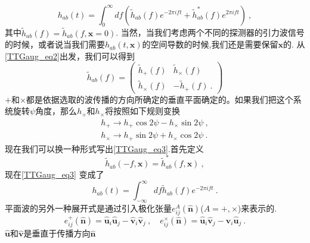 \begin{equation}\label{TTGaug_eq3}
h_{ab} (t) = \int^\infty_0 df ( \tilde h_{ab} (f) e^{-2\pi i f t} + \tilde h^*_{ab} (f) e^{2\pi i f t} ) ~, 
\end{equation}
其中$\tilde h_{ab}(f) = \tilde h_{ab}(f,\mathbf x = 0)$. 当然，当我们考虑两个不同的探测器的引力波信号的时候，或者说当我们需要$h_{ab}(t,\mathbf x)$的空间导数的时候,我们还是需要保留$\mathbf x$的. 从\autoref{TTGaug_eq2}出发，我们可以得到
\begin{equation}
\tilde h_{ab} (f) = 
\begin{pmatrix}
\tilde h_+(f) & \tilde h_{\times} (f) \\
\tilde h_{\times} (f) & -\tilde h_+ (f) ~.
\end{pmatrix}
\end{equation}
$+$和$\times$都是依据选取的波传播的方向所确定的垂直平面确定的。如果我们把这个系统旋转$\psi$角度，那么$h_+$和$h_{\times}$将按照如下规则变换
\begin{equation}
\begin{aligned}
h_+\rightarrow h_+ \cos 2 \psi - h_\times \sin 2 \psi ~, \\
h_\times \rightarrow h_+ \sin 2 \psi + h_\times \cos 2\psi ~.
\end{aligned}
\end{equation}
现在我们可以换一种形式写出\autoref{TTGaug_eq3}.首先定义
\begin{equation}
\tilde h_{ab} (-f,\mathbf x) = \tilde h^*_{ab} (f,\mathbf x) ~,
\end{equation}
现在\autoref{TTGaug_eq3} 变成了
\begin{equation}
h_{ab} (t) = \int_{-\infty}^{\infty} df \tilde h_{ab} (f) e^{-2\pi i f t}~. 
\end{equation}
平面波的另外一种展开式是通过引入极化张量$e^A_{ij}(\hat{ {\mathbf n} })$($A = +,\times$)来表示的. 
\begin{equation}
e^+_{ij} (\hat{ {\mathbf n} }) = \hat{{\mathbf u} }_i \hat{{\mathbf u} }_j - \hat{{\mathbf v} }_i \hat{{\mathbf v} }_j~, \quad e^\times_{ij} (\hat{ {\mathbf n} }) = \hat{{\mathbf u} }_i \hat{{\mathbf v} }_j - \hat{{\mathbf v} }_i \hat{{\mathbf u} }_j ~.
\end{equation}
$\hat{ {\mathbf u} }$和$\hat{ {\mathbf v} }$是垂直于传播方向$\hat{  {\mathbf n}  }$


 


 

















